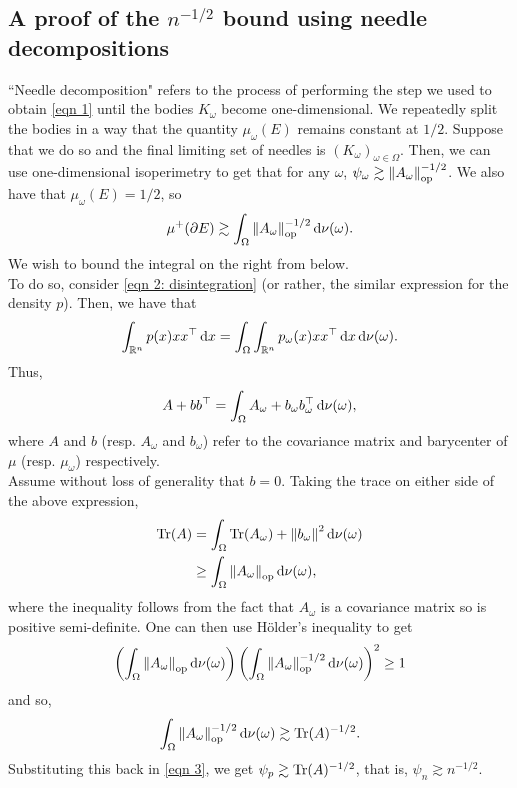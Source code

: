 \documentclass{article}
\begin{document}
	\subsection{A proof of the \texorpdfstring{$n^{-1/2}$}{n-12} bound using needle decompositions}

		``Needle decomposition" refers to the process of performing the step we used to obtain \eqref{eqn 1} until the bodies $K_\omega$ become one-dimensional. We repeatedly split the bodies in a way that the quantity $\mu_\omega(E)$ remains constant at $1/2$. Suppose that we do so and the final limiting set of needles is $(K_\omega)_{\omega\in\Omega}$. Then, we can use one-dimensional isoperimetry to get that for any $\omega$, $\psi_\omega \gtrsim \left\lVert A_\omega\right\rVert_{\text{op}}^{-1/2}$. We also have that $\mu_\omega(E) = 1/2$, so
		\begin{equation}
			\label{eqn 3}
			\mu^+(\partial E) \gtrsim \int_\Omega \left\lVert A_\omega\right\rVert_{\text{op}}^{-1/2} \operatorname{d}\!{\nu}(\omega).
		\end{equation}
		We wish to bound the integral on the right from below.\\

		To do so, consider \eqref{eqn 2: disintegration} (or rather, the similar expression for the density $p$). Then, we have that
		\[ \int_{\Rn} p(x) xx^\top \dif x = \int_\Omega \int_{\Rn} p_\omega(x) xx^\top \dif x \dif {\nu(\omega)}. \]
		Thus,
		\begin{equation}
			\label{eqn 5}
			A + bb^\top = \int_\Omega A_\omega + b_\omega b_\omega^\top \operatorname{d}\!{\nu(\omega)},
		\end{equation}
		where $A$ and $b$ (resp. $A_\omega$ and $b_\omega$) refer to the covariance matrix and barycenter of $\mu$ (resp. $\mu_\omega$) respectively.\\
		Assume without loss of generality that $b = 0$. Taking the trace on either side of the above expression,
		\begin{align*}
			\operatorname{Tr}(A) &= \int_\Omega \operatorname{Tr}(A_\omega) + \left\lVert b_\omega\right\rVert^2 \operatorname{d}\!{\nu(\omega)} \\
				&\geq \int_\Omega \left\lVert A_\omega\right\rVert_{\text{op}} \operatorname{d}\!{\nu(\omega)},
		\end{align*}
		where the inequality follows from the fact that $A_\omega$ is a covariance matrix so is positive semi-definite.
		One can then use H\"older's inequality to get
		\[ \left(\int_\Omega \left\lVert A_\omega\right\rVert_{\text{op}} \operatorname{d}\!{\nu(\omega)} \right) \left( \int_\Omega \left\lVert A_\omega\right\rVert_{\text{op}}^{-1/2} \operatorname{d}\!{\nu(\omega)} \right)^2 \geq 1 \]
		and so,
		\[ \int_\Omega \left\lVert A_\omega\right\rVert_{\text{op}}^{-1/2} \operatorname{d}\!{\nu(\omega)} \gtrsim \operatorname{Tr}(A)^{-1/2}.  \]
		Substituting this back in \eqref{eqn 3}, we get $\psi_p \gtrsim \operatorname{Tr}(A)^{-1/2}$, that is, $\psi_n \gtrsim n^{-1/2}$.
\end{document}
